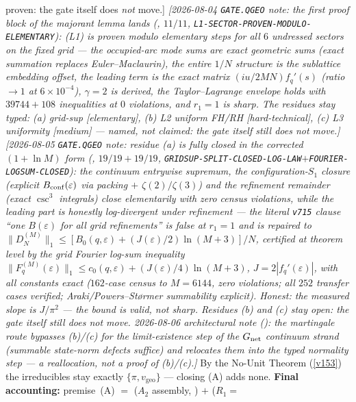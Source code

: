 \documentclass[11pt,a4paper]{article}
\begin{document}
\begin{keybox}
{proven: the gate itself does \emph{not} move.]}
\emph{[2026-08-04 \texttt{GATE.QGEO} note: the first proof block of the majorant lemma lands
(, $11/11$, \texttt{L1-SECTOR-PROVEN-MODULO-ELEMENTARY}):
(L1) is proven modulo elementary steps for all $6$ undressed sectors on the fixed grid --- the
occupied-arc mode sums are \emph{exact} geometric sums (exact summation replaces Euler--Maclaurin), the
entire $1/N$ structure is the sublattice embedding offset, the leading term is the exact matrix
$(iu/2MN)f_q'(s)$ (ratio $\to1$ at $6\times10^{-4}$), $\gamma=2$ is \emph{derived}, the Taylor--Lagrange
envelope holds with $39744{+}108$ inequalities at $0$ violations, and $r_1=1$ is sharp.  The residues stay
typed: (a) grid-sup [elementary], (b) L2 uniform FH/RH [hard-technical], (c) L3 uniformity [medium] ---
named, not claimed: the gate itself still does \emph{not} move.]}
\emph{[2026-08-05 \texttt{GATE.QGEO} note: residue (a) is \emph{fully closed} in the corrected
$(1+\ln M)$ form (, $19/19+19/19$,
\texttt{GRIDSUP-SPLIT-CLOSED-LOG-LAW}$+$\texttt{FOURIER-LOGSUM-CLOSED}): the continuum entrywise
supremum, the configuration-$S_1$ closure (explicit $B_{\rm conf}(\varepsilon)$ via packing $+$
$\zeta(2)/\zeta(3)$) and the refinement remainder (exact $\csc^3$ integrals) close elementarily with
zero census violations, while the leading part is honestly \emph{log-divergent} under refinement ---
the literal \texttt{v715} clause ``one $B(\varepsilon)$ for \emph{all} grid refinements'' is false at
$r_1=1$ and is repaired to $\|D_N^{(M)}\|_1\le[B_0(q,\varepsilon)+(J(\varepsilon)/2)\ln(M{+}3)]/N$,
certified at theorem level by the grid Fourier log-sum inequality
$\|F_q^{(M)}(\varepsilon)\|_1\le c_0(q,\varepsilon)+(J(\varepsilon)/4)\ln(M{+}3)$,
$J=2|f_q'(\varepsilon)|$, with all constants exact ($162$-case census to $M=6144$, zero violations;
all $252$ transfer cases verified; Araki/Powers--St\o rmer summability explicit).  Honest: the
measured slope is $J/\pi^2$ --- the bound is valid, not sharp.  Residues (b) and (c) stay open: the
gate itself still does \emph{not} move.  2026-08-06 architectural note
(): the martingale route bypasses (b)/(c) for the
limit-\emph{existence} step of the $G_{\rm net}$ continuum strand (summable state-norm defects
suffice) and relocates them into the typed normality step --- a reallocation, not a proof of
(b)/(c).]}
By the No-Unit Theorem (\vref{v153}) the irreducibles stay exactly $\{\pi,v_{\mathrm{geo}}\}$ --- closing
(A) adds none. \textbf{Final accounting:} premise~(A) $=$ ($A_2$ assembly, \mC) $+$ ($R_1{=}$%

\end{keybox}
\end{document}
